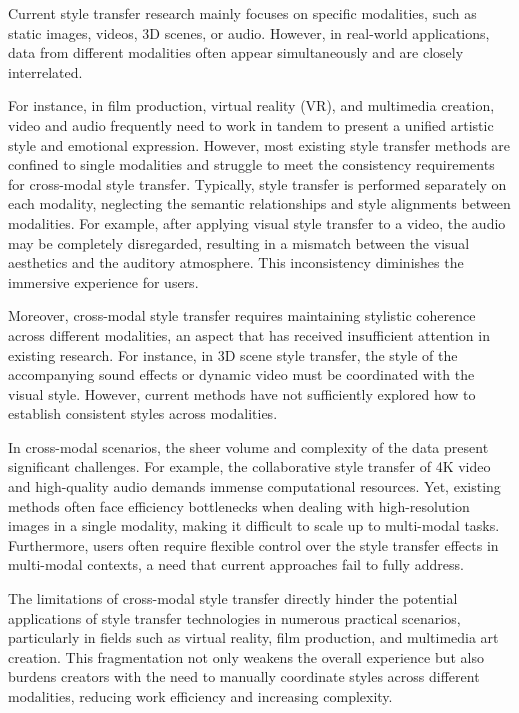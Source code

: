 \documentclass[preprint,12pt]{elsarticle}
\begin{document}
Current style transfer research mainly focuses on specific modalities, such as static images, videos, 3D scenes, or audio. However, in real-world applications, data from different modalities often appear simultaneously and are closely interrelated.

For instance, in film production, virtual reality (VR), and multimedia creation, video and audio frequently need to work in tandem to present a unified artistic style and emotional expression. However, most existing style transfer methods are confined to single modalities and struggle to meet the consistency requirements for cross-modal style transfer. Typically, style transfer is performed separately on each modality, neglecting the semantic relationships and style alignments between modalities. For example, after applying visual style transfer to a video, the audio may be completely disregarded, resulting in a mismatch between the visual aesthetics and the auditory atmosphere. This inconsistency diminishes the immersive experience for users.

Moreover, cross-modal style transfer requires maintaining stylistic coherence across different modalities, an aspect that has received insufficient attention in existing research. For instance, in 3D scene style transfer, the style of the accompanying sound effects or dynamic video must be coordinated with the visual style. However, current methods have not sufficiently explored how to establish consistent styles across modalities.

In cross-modal scenarios, the sheer volume and complexity of the data present significant challenges. For example, the collaborative style transfer of 4K video and high-quality audio demands immense computational resources. Yet, existing methods often face efficiency bottlenecks when dealing with high-resolution images in a single modality, making it difficult to scale up to multi-modal tasks. Furthermore, users often require flexible control over the style transfer effects in multi-modal contexts, a need that current approaches fail to fully address.

The limitations of cross-modal style transfer directly hinder the potential applications of style transfer technologies in numerous practical scenarios, particularly in fields such as virtual reality, film production, and multimedia art creation. This fragmentation not only weakens the overall experience but also burdens creators with the need to manually coordinate styles across different modalities, reducing work efficiency and increasing complexity.
% 
\end{document}
